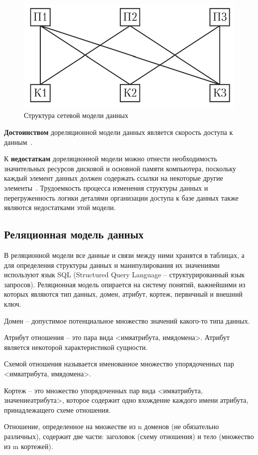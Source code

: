 \begin{figure}[H]
	\centering
	\includegraphics[width=0.5\linewidth]{img/network_db.png}
	\caption{Структура сетевой модели данных}
	\label{network}
\end{figure}

\textbf{Достоинством} дореляционной модели данных является скорость доступа к данным~\cite{ilushechkinz}.

К \textbf{недостаткам} дореляционной модели можно отнести необходимость значительных ресурсов дисковой и основной памяти компьютера, поскольку каждый элемент данных должен содержать ссылки на некоторые другие элементы~\cite{ilushechkinz}. Трудоемкость процесса изменения структуры данных и перегруженность логики деталями организации доступа к базе данных также являются недостатками этой модели.



\subsection{Реляционная модель данных}
В реляционной модели все данные и связи между ними хранятся в таблицах, а для определения структуры данных и манипулирования их значениями используют язык SQL (Structured Query Language -- структурированный язык запросов). Реляционная модель опирается на систему понятий, важнейшими из которых являются тип данных, домен, атрибут, кортеж, первичный и внешний ключ.  


Домен -- допустимое потенциальное множество значений какого-то
типа данных. 

Атрибут отношения -- это пара вида <имя\textunderscore атрибута, имя\textunderscore домена>. Атрибут является некоторой характеристикой сущности.

Схемой отношения называется именованное множество упорядоченных пар <имя\textunderscore атрибута, имя\textunderscore домена>. 

Кортеж -- это множество упорядоченных пар вида <имя\textunderscore атрибута, значение\textunderscore атрибута>, которое содержит одно вхождение каждого имени атрибута, принадлежащего схеме отношения.

Отношение, определенное на множестве из n доменов (не обязательно различных), содержит две части: заголовок (схему отношения) и тело (множество из m кортежей).

